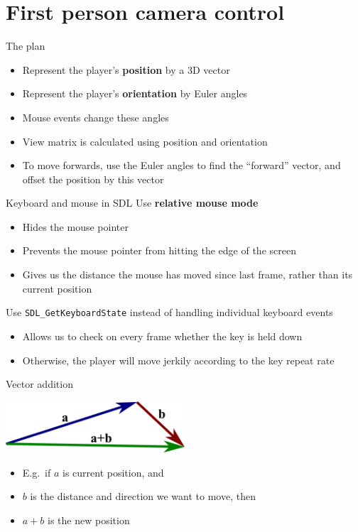 \part{First person camera control}
\frame{\partpage}

\begin{frame}{The plan}
	\begin{itemize}
		\pause\item Represent the player's \textbf{position} by a 3D vector
		\pause\item Represent the player's \textbf{orientation} by Euler angles
		\pause\item Mouse events change these angles
		\pause\item View matrix is calculated using position and orientation
		\pause\item To move forwards, use the Euler angles to find the ``forward'' vector,
			and offset the position by this vector
	\end{itemize}
\end{frame}

\begin{frame}{Keyboard and mouse in SDL}
	\pause Use \textbf{relative mouse mode}
	\begin{itemize}
		\pause\item Hides the mouse pointer
		\pause\item Prevents the mouse pointer from hitting the edge of the screen
		\pause\item Gives us the distance the mouse has moved since last frame, rather than its current position
	\end{itemize}
	\pause Use \lstinline{SDL_GetKeyboardState} instead of handling individual keyboard events
	\begin{itemize}
		\pause\item Allows us to check on every frame whether the key is held down
		\pause\item Otherwise, the player will move jerkily according to the key repeat rate
	\end{itemize}
\end{frame}

\begin{frame}{Vector addition}
	\pause
	\begin{center}
		\colorbox{white}{
			\includegraphics[width=0.5\textwidth]{vector_addition}
		}
	\end{center}
	\begin{itemize}
		\pause\item E.g.\ if $a$ is current position, and
		\pause\item $b$ is the distance and direction we want to move, then
		\pause\item $a + b$ is the new position
	\end{itemize}
\end{frame}

